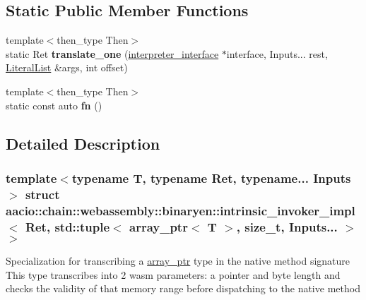 \subsection*{Static Public Member Functions}
\begin{DoxyCompactItemize}
\item 
\mbox{\label{structaacio_1_1chain_1_1webassembly_1_1binaryen_1_1intrinsic__invoker__impl_3_01_ret_00_01std_1_b3e975430cfc0d3e9c5a425fc85ba2d6_a5e8607d13f5cafb9b8e23e44a45884f3}} 
{\footnotesize template$<$then\+\_\+type Then$>$ }\\static Ret {\bfseries translate\+\_\+one} (\mbox{\hyperlink{structaacio_1_1chain_1_1webassembly_1_1binaryen_1_1interpreter__interface}{interpreter\+\_\+interface}} $\ast$interface, Inputs... rest, \mbox{\hyperlink{classstd_1_1vector}{Literal\+List}} \&args, int offset)
\item 
\mbox{\label{structaacio_1_1chain_1_1webassembly_1_1binaryen_1_1intrinsic__invoker__impl_3_01_ret_00_01std_1_b3e975430cfc0d3e9c5a425fc85ba2d6_a0f080e969398809c784f552418e82d2b}} 
{\footnotesize template$<$then\+\_\+type Then$>$ }\\static const auto {\bfseries fn} ()
\end{DoxyCompactItemize}


\subsection{Detailed Description}
\subsubsection*{template$<$typename T, typename Ret, typename... Inputs$>$\newline
struct aacio\+::chain\+::webassembly\+::binaryen\+::intrinsic\+\_\+invoker\+\_\+impl$<$ Ret, std\+::tuple$<$ array\+\_\+ptr$<$ T $>$, size\+\_\+t, Inputs... $>$ $>$}

Specialization for transcribing a \mbox{\hyperlink{structaacio_1_1chain_1_1array__ptr}{array\+\_\+ptr}} type in the native method signature This type transcribes into 2 wasm parameters\+: a pointer and byte length and checks the validity of that memory range before dispatching to the native method


